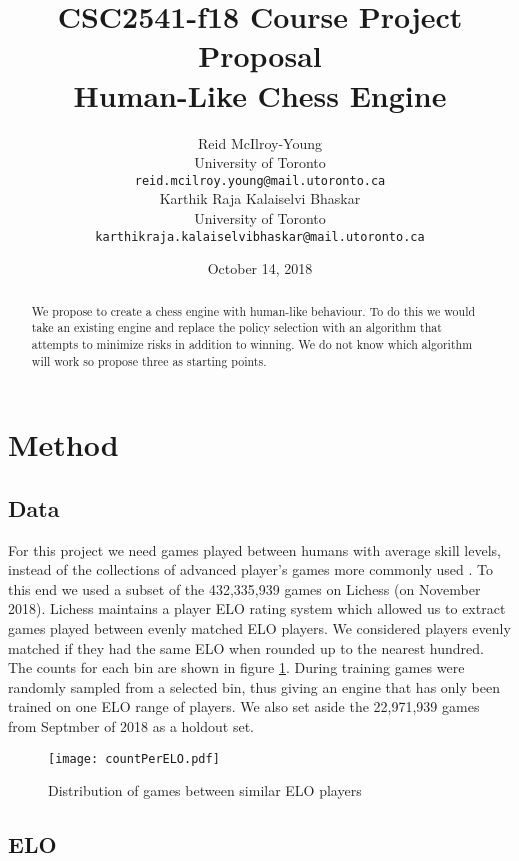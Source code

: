 \documentclass{article}
\title{CSC2541-f18 Course Project Proposal\\Human-Like Chess Engine}
\author{
	Reid McIlroy-Young\\
	University of Toronto\\
	\texttt{reid.mcilroy.young@mail.utoronto.ca} \\
	 \And
	 Karthik Raja Kalaiselvi Bhaskar \\
	 University of Toronto\\
	 \texttt{karthikraja.kalaiselvibhaskar@mail.utoronto.ca} \\
}
\date{October 14, 2018}
\begin{document}
\maketitle

\begin{abstract}
	We propose to create a chess engine with human-like behaviour. To do this we would take an existing engine and replace the policy selection with an algorithm that attempts to minimize risks in addition to winning. We do not know which algorithm will work so propose three as starting points.
\end{abstract}


\section{Method}

\subsection{Data}

For this project we need games played between humans with average skill levels, instead of the collections of advanced player's games more commonly used \cite{david2016deepchess}. To this end we used a subset of the 432,335,939 games on Lichess \cite{lichess} (on November 2018). Lichess maintains a player ELO rating system which allowed us to extract games played between evenly matched ELO players. We considered players evenly matched if they had the same ELO when rounded up to the nearest hundred. The counts for each bin are shown in figure \ref{eloG}. During training games were randomly sampled from a selected bin, thus giving an engine that has only been trained on one ELO range of players. We also set aside the 22,971,939 games from Septmber of 2018 as a holdout set.

\begin{figure}[ht]
	\centering
	\begin{adjustbox}{center}
		\texttt{[image: countPerELO.pdf]}
	\end{adjustbox}
	\caption{Distribution of games between similar ELO players}\label{eloG}
\end{figure}

\subsection{ELO}
\end{document}
